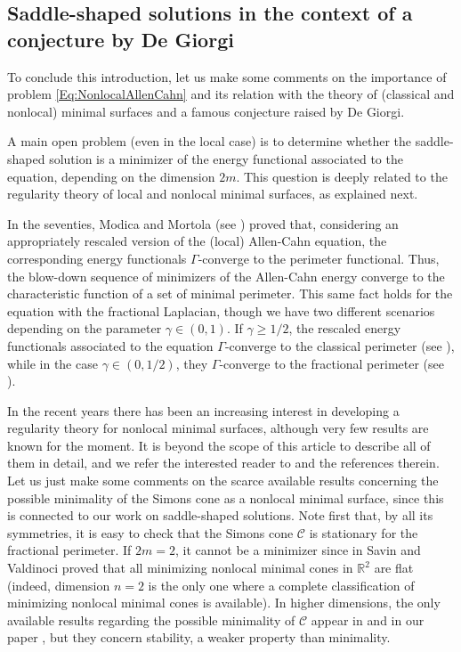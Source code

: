 \documentclass[12pt,reqno]{amsart}
\theoremstyle{definition}
\theoremstyle{remark}
\newcommand{\con}[1]{\mathbb{#1}}
\newcommand{\R}{\con{R}} %
\newcommand{\ccal}{\mathscr{C}}
\newcommand{\s}{\gamma}
\numberwithin{equation}{section}
\begin{document}
\subsection{Saddle-shaped solutions in the context of a conjecture by De Giorgi}
\label{Subsec:DeGiorgi}

To conclude this introduction, let us make some comments on the importance of problem \eqref{Eq:NonlocalAllenCahn} and its relation with the theory of (classical and nonlocal) minimal surfaces and a famous conjecture raised by De Giorgi.

A main open problem (even in the local case) is to determine whether the saddle-shaped solution is a minimizer of the energy functional associated to the equation, depending on the dimension $2m$. This question is deeply related to the regularity theory of local and nonlocal minimal surfaces, as explained next.

In the seventies, Modica and Mortola (see \cite{Modica,ModicaMortola}) proved that, considering an appropriately rescaled version of the (local) Allen-Cahn equation, the corresponding energy functionals $\Gamma$-converge to the perimeter functional. Thus, the blow-down sequence of minimizers of the Allen-Cahn energy converge to the characteristic function of a set of minimal perimeter. This same fact holds for the equation with the fractional Laplacian, though we have two different scenarios depending on the parameter $\s \in (0,1)$. If $\s \geq 1/2$, the rescaled energy functionals associated to the equation $\Gamma$-converge to the classical perimeter (see \cite{AlbertiBouchitteSeppecher,Gonzalez}), while in the case $\s \in (0,1/2)$, they $\Gamma$-converge to the fractional perimeter (see \cite{SavinValdinoci-GammaConvergence}). 

In the recent years there has been an increasing interest in developing a regularity theory for nonlocal minimal surfaces, although very few results are known for the moment. It is beyond the scope of this article to describe all of them in detail, and we refer the interested reader to \cite{CozziFigalli-Survey, BucurValdinoci} and the references therein. Let us just make some comments on the scarce available results concerning the possible minimality of the Simons cone as a nonlocal minimal surface, since this is connected to our work on saddle-shaped solutions. Note first that, by all its symmetries, it is easy to check that the Simons cone $\ccal$ is stationary for the fractional perimeter. If $2m=2$, it cannot be a minimizer since in \cite{SavinValdinoci-Cones} Savin and Valdinoci proved that all minimizing nonlocal minimal cones in $\R^2$ are flat (indeed, dimension $n=2$ is the only one where a complete classification of minimizing nonlocal minimal cones is available). In higher dimensions, the only available results regarding the possible minimality of $\ccal$ appear in \cite{DaviladelPinoWei} and in our paper \cite{Felipe-Sanz-Perela:SaddleFractional}, but they concern stability, a weaker property than minimality. 
\end{document}
